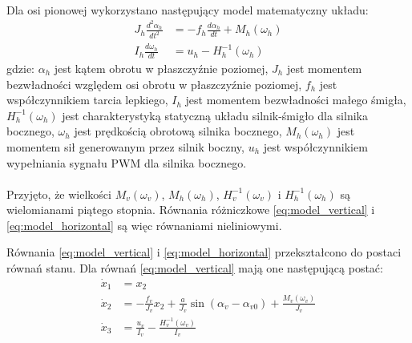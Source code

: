\documentclass[11pt,a4paper]{article}
\begin{document}
\paragraph*{}
Dla osi pionowej wykorzystano następujący model matematyczny układu:
\begin{equation}
\begin{aligned}
J_h \frac{d^2\alpha_h}{dt^2} &= -f_h\frac{d\alpha_h}{dt}+M_h(\omega_h)\\
I_h\frac{d\omega_h}{dt} &= u_h - H_h^{-1}(\omega_h)
\end{aligned}
\label{eq:model_horizontal}
\end{equation}
\noindent gdzie:\newline
\(\alpha_h\) jest kątem obrotu w płaszczyźnie poziomej,\newline
\(J_h\) jest momentem bezwładności względem osi obrotu w płaszczyźnie poziomej,\newline
\(f_h\) jest współczynnikiem tarcia lepkiego,\newline
\(I_h\) jest momentem bezwładności małego śmigła,\newline
\(H_h^{-1}(\omega_h)\) jest charakterystyką statyczną układu silnik-śmigło dla silnika bocznego,\newline
\(\omega_h\) jest prędkością obrotową silnika bocznego,\newline
\(M_h(\omega_h)\) jest momentem sił generowanym przez silnik boczny,\newline
\(u_h\) jest współczynnikiem wypełniania sygnału PWM dla silnika bocznego.
\paragraph*{}
Przyjęto, że wielkości \(M_v(\omega_v)\), \(M_h(\omega_h)\), \(H_v^{-1}(\omega_v)\) i \(H_h^{-1}(\omega_h)\) są wielomianami piątego stopnia. Równania różniczkowe \eqref{eq:model_vertical} i \eqref{eq:model_horizontal} są więc równaniami nieliniowymi.

Równania \eqref{eq:model_vertical} i \eqref{eq:model_horizontal} przekształcono do postaci równań stanu. Dla równań \eqref{eq:model_vertical} mają one następującą postać:
\begin{equation}
\begin{aligned}
\dot x_1 &= x_2\\
\dot x_2 &= -\frac{f_v}{J_v}x_2+\frac{a}{J_v}\sin (\alpha_v-\alpha_{v0})+\frac{M_v(\omega_v)}{J_v}\\
\dot x_3 &= \frac{u_v}{I_v}-\frac{H_v^{-1}(\omega_v)}{I_v}
\end{aligned}
\end{equation}
\end{document}
